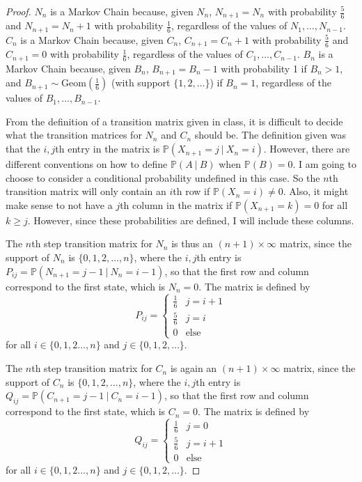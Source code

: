 \documentclass[12pt]{article}
\newcommand{\p}{\mathbb{P}}
\theoremstyle{definition}
\begin{document}
\begin{proof}

$N_n$ is a Markov Chain because, given $N_n$, $N_{n+1} = N_n$ with probability $\frac56$ and $N_{n+1} = N_n+1$ with probability $\frac16$, regardless of the values of $N_1, \dots, N_{n-1}$.  $C_n$ is a Markov Chain because, given $C_n$, $C_{n+1} = C_{n} + 1$ with probability $\frac56$ and $C_{n+1} = 0$ with probability $\frac16$, regardless of the values of $C_1, \dots, C_{n-1}$.  $B_n$ is a Markov Chain because, given $B_n$, $B_{n+1} = B_n - 1$ with probability 1 if $B_n > 1$, and $B_{n+1} \sim \text{Geom}\left(\frac16\right)$ (with support $\{1,2, \dots \}$) if $B_n = 1$, regardless of the values of $B_1, \dots, B_{n-1}$.

From the definition of a transition matrix given in class, it is difficult to decide what the transition matrices for $N_n$ and $C_n$ should be.  The definition given was that the $i,j$th entry in the matrix is $\p\left(X_{n+1} = j \ | \ X_n = i\right)$.  However, there are different conventions on how to define $\p\left(A \ | \ B\right)$ when $\p\left(B\right) = 0$.  I am going to choose to consider a conditional probability undefined in this case.  So the $n$th transition matrix will only contain an $i$th row if $\p\left(X_n = i\right) \neq 0$.  Also, it might make sense to not have a $j$th column in the matrix if $\p\left(X_{n+1} = k\right) = 0$ for all $k \geq j$.  However, since these probabilities are defined, I will include these columns.

The $n$th step transition matrix for $N_n$ is thus an $\left(n+1\right) \times \infty$ matrix, since the support of $N_n$ is $\{0, 1, 2, \dots , n \}$, where the $i,j$th entry is $P_{ij} = \p\left(N_{n+1} = j - 1 \ | \ N_n = i - 1\right)$, so that the first row and column correspond to the first state, which is $N_n = 0$.  The matrix is defined by
\[ P_{ij} = \begin{cases}
      \frac16 & j = i+1 \\
      \frac56 & j = i \\
      0 & \text{else}
   \end{cases}
\]
for all $i \in \{0, 1, 2 \dots , n \}$ and $j \in \{0, 1, 2, \dots \}$.

The $n$th step transition matrix for $C_n$ is again an $\left(n+1\right) \times \infty$ matrix, since the support of $C_n$ is $\{0, 1, 2, \dots , n \}$, where the $i,j$th entry is $Q_{ij} = \p\left(C_{n+1} = j - 1 \ | \ C_n = i - 1\right)$, so that the first row and column correspond to the first state, which is $C_n = 0$.  The matrix is defined by
\[ Q_{ij} = \begin{cases}
      \frac16 & j = 0 \\
      \frac56 & j = i + 1 \\
      0 & \text{else}
   \end{cases}
\]
for all $i \in \{0, 1, 2 \dots , n \}$ and $j \in \{0, 1, 2, \dots \}$.


\end{proof}
\end{document}
